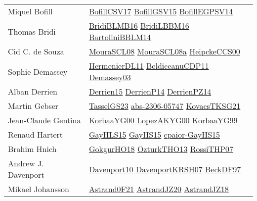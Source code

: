 {\begin{longtable}{p{4cm}p{20cm}}
Miquel Bofill & \href{papers/BofillCSV17.pdf}{BofillCSV17}\cite{BofillCSV17} \href{papers/BofillGSV15.pdf}{BofillGSV15}\cite{BofillGSV15} \href{papers/BofillEGPSV14.pdf}{BofillEGPSV14}\cite{BofillEGPSV14} \\
Thomas Bridi & \href{articles/BridiBLMB16.pdf}{BridiBLMB16}\cite{BridiBLMB16} \href{papers/BridiLBBM16.pdf}{BridiLBBM16}\cite{BridiLBBM16} \href{papers/BartoliniBBLM14.pdf}{BartoliniBBLM14}\cite{BartoliniBBLM14} \\
Cid C. de Souza & \href{papers/MouraSCL08.pdf}{MouraSCL08}\cite{MouraSCL08} \href{papers/MouraSCL08a.pdf}{MouraSCL08a}\cite{MouraSCL08a} \href{articles/HeipckeCCS00.pdf}{HeipckeCCS00}\cite{HeipckeCCS00} \\
Sophie Demassey & \href{papers/HermenierDL11.pdf}{HermenierDL11}\cite{HermenierDL11} \href{articles/BeldiceanuCDP11.pdf}{BeldiceanuCDP11}\cite{BeldiceanuCDP11} \href{}{Demassey03}\cite{Demassey03} \\
Alban Derrien & \href{}{Derrien15}\cite{Derrien15} \href{papers/DerrienP14.pdf}{DerrienP14}\cite{DerrienP14} \href{papers/DerrienPZ14.pdf}{DerrienPZ14}\cite{DerrienPZ14} \\
Martin Gebser & \href{papers/TasselGS23.pdf}{TasselGS23}\cite{TasselGS23} \href{articles/abs-2306-05747.pdf}{abs-2306-05747}\cite{abs-2306-05747} \href{papers/KovacsTKSG21.pdf}{KovacsTKSG21}\cite{KovacsTKSG21} \\
Jean{-}Claude Gentina & \href{articles/KorbaaYG00.pdf}{KorbaaYG00}\cite{KorbaaYG00} \href{articles/LopezAKYG00.pdf}{LopezAKYG00}\cite{LopezAKYG00} \href{papers/KorbaaYG99.pdf}{KorbaaYG99}\cite{KorbaaYG99} \\
Renaud Hartert & \href{papers/GayHLS15.pdf}{GayHLS15}\cite{GayHLS15} \href{papers/GayHS15.pdf}{GayHS15}\cite{GayHS15} \href{papers/cpaior-GayHS15.pdf}{cpaior-GayHS15}\cite{cpaior-GayHS15} \\
Brahim Hnich & \href{}{GokgurHO18}\cite{GokgurHO18} \href{articles/OzturkTHO13.pdf}{OzturkTHO13}\cite{OzturkTHO13} \href{papers/RossiTHP07.pdf}{RossiTHP07}\cite{RossiTHP07} \\
Andrew J. Davenport & \href{papers/Davenport10.pdf}{Davenport10}\cite{Davenport10} \href{papers/DavenportKRSH07.pdf}{DavenportKRSH07}\cite{DavenportKRSH07} \href{papers/BeckDF97.pdf}{BeckDF97}\cite{BeckDF97} \\
Mikael Johansson & \href{papers/Astrand0F21.pdf}{Astrand0F21}\cite{Astrand0F21} \href{articles/AstrandJZ20.pdf}{AstrandJZ20}\cite{AstrandJZ20} \href{papers/AstrandJZ18.pdf}{AstrandJZ18}\cite{AstrandJZ18} \\

\end{longtable}}
